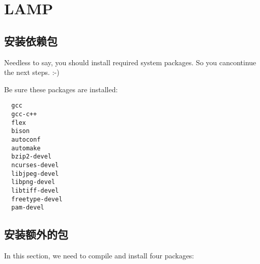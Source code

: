 \chapter{LAMP}

\section{安装依赖包}

Needless to say, you should install required system packages. So you
cancontinue the next steps. :-)

Be sure these packages are installed:

\small{
\begin{verbatim}
  gcc
  gcc-c++
  flex
  bison
  autoconf
  automake
  bzip2-devel
  ncurses-devel
  libjpeg-devel
  libpng-devel
  libtiff-devel
  freetype-devel
  pam-devel
\end{verbatim}
}
\normalsize

\section{安装额外的包}

In this section, we need to compile and install four packages:

